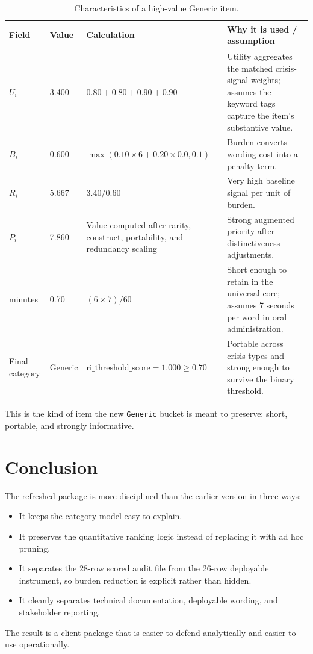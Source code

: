 \documentclass[12pt]{article}
\begin{document}
\begin{table}[H]
\centering
\begin{tabularx}{\textwidth}{L{0.18\textwidth} R{0.10\textwidth} Y Y}
\toprule
Field & Value & Calculation & Why it is used / assumption \\
\midrule
$U_i$ & 3.400 & $0.80 + 0.80 + 0.90 + 0.90$ & Utility aggregates the matched crisis-signal weights; assumes the keyword tags capture the item's substantive value. \\
$B_i$ & 0.600 & $\max(0.10 \times 6 + 0.20 \times 0.0, 0.1)$ & Burden converts wording cost into a penalty term. \\
$R_i$ & 5.667 & $3.40 / 0.60$ & Very high baseline signal per unit of burden. \\
$P_i$ & 7.860 & Value computed after rarity, construct, portability, and redundancy scaling & Strong augmented priority after distinctiveness adjustments. \\
minutes & 0.70 & $(6 \times 7) / 60$ & Short enough to retain in the universal core; assumes 7 seconds per word in oral administration. \\
Final category & Generic & $\text{ri\_threshold\_score} = 1.000 \geq 0.70$ & Portable across crisis types and strong enough to survive the binary threshold. \\
\bottomrule
\end{tabularx}
\caption{Characteristics of a high-value Generic item.}
\end{table}

This is the kind of item the new \texttt{Generic} bucket is meant to preserve: short, portable, and strongly informative.

\section{Conclusion}

The refreshed package is more disciplined than the earlier version in three ways:

\begin{itemize}
\item It keeps the category model easy to explain.
\item It preserves the quantitative ranking logic instead of replacing it with ad hoc pruning.
\item It separates the 28-row scored audit file from the 26-row deployable instrument, so burden reduction is explicit rather than hidden.
\item It cleanly separates technical documentation, deployable wording, and stakeholder reporting.
\end{itemize}

The result is a client package that is easier to defend analytically and easier to use operationally.
\end{document}
